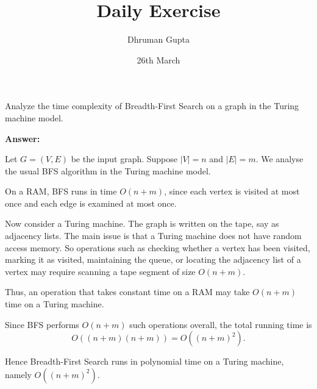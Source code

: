 \documentclass[11pt]{article}
\title{Daily Exercise}
\author{Dhruman Gupta}
\date{26th March}
\begin{document}

Analyze the time complexity of Breadth-First Search on a graph in the Turing machine model.

\textbf{Answer:}

Let $G = (V,E)$ be the input graph. Suppose $|V| = n$ and $|E| = m$. We analyse the usual BFS algorithm in the Turing machine model.

On a RAM, BFS runs in time $O(n+m)$, since each vertex is visited at most once and each edge is examined at most once.

Now consider a Turing machine. The graph is written on the tape, say as adjacency lists. The main issue is that a Turing machine does not have random access memory. So operations such as checking whether a vertex has been visited, marking it as visited, maintaining the queue, or locating the adjacency list of a vertex may require scanning a tape segment of size $O(n+m)$.

Thus, an operation that takes constant time on a RAM may take $O(n+m)$ time on a Turing machine.

Since BFS performs $O(n+m)$ such operations overall, the total running time is
\[
O((n+m)(n+m)) = O((n+m)^2).
\]

Hence Breadth-First Search runs in polynomial time on a Turing machine, namely $O((n+m)^2)$.
\end{document}
